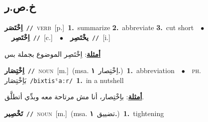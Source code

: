 \documentclass[10pt,a4paper,twoside]{article} %
\begin{document}
\begin{multicols}{2}
\vspace{-3mm}
\subsection*{\color{blue}\foreignlanguage{arabic}{خ.ص.ر}\color{blue}{}} 

{\setlength\topsep{0pt}\textbf{\foreignlanguage{arabic}{اِخْتَصَر}}\ {\color{gray}\texttt{//}\color{black}}\ \textsc{verb}\ [p.]\ \textbf{1.}~summarize  \textbf{2.}~abbreviate  \textbf{3.}~cut short\ \ $\bullet$\ \ \setlength\topsep{0pt}\textbf{\foreignlanguage{arabic}{اِخْتَصِر}}\ {\color{gray}\texttt{//}\color{black}}\ [c.]\ \ $\bullet$\ \ \setlength\topsep{0pt}\textbf{\foreignlanguage{arabic}{يخْتَصِر}}\ {\color{gray}\texttt{//}\color{black}}\ [i.]\  \begin{flushright}\color{gray}\foreignlanguage{arabic}{\textbf{\underline{\foreignlanguage{arabic}{أمثلة}}}: اِخْتَصِر الموضوع بجملة بس}\end{flushright}\color{black}} \vspace{2mm}

{\setlength\topsep{0pt}\textbf{\foreignlanguage{arabic}{اِخْتِصَار}}\ {\color{gray}\texttt{//}\color{black}}\ \textsc{noun}\ [m.]\ \color{gray}(msa. \foreignlanguage{arabic}{اِخْتِصار}~\foreignlanguage{arabic}{\textbf{١.}})\color{black}\ \textbf{1.}~abbreviation\ \ $\bullet$\ \ \textsc{ph.} \color{gray} \foreignlanguage{arabic}{بَاِخْتِصَار}\color{black}\ {\color{gray}\texttt{/{\sffamily bixtisˤaːr}/}\color{black}}\ \textbf{1.}~in a nutshell\  \begin{flushright}\color{gray}\foreignlanguage{arabic}{\textbf{\underline{\foreignlanguage{arabic}{أمثلة}}}: باِخْتِصار، أنا مش مرتاحة معه وبدِّي أتطلَّق.}\end{flushright}\color{black}} \vspace{2mm}

{\setlength\topsep{0pt}\textbf{\foreignlanguage{arabic}{تَخْصِير}}\ {\color{gray}\texttt{//}\color{black}}\ \textsc{noun}\ [m.]\ \color{gray}(msa. \foreignlanguage{arabic}{تضييق}~\foreignlanguage{arabic}{\textbf{١.}})\color{black}\ \textbf{1.}~tightening\ } \vspace{2mm}


\end{multicols}
\end{document}
